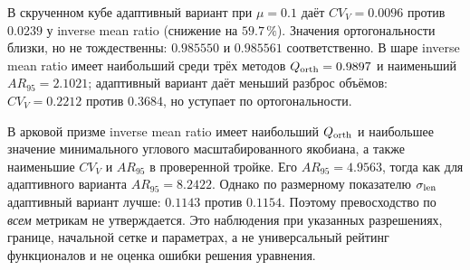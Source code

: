 В скрученном кубе адаптивный вариант при $\mu=0.1$ даёт
$CV_V=0.0096$ против $0.0239$ у inverse mean ratio
(снижение на $59.7\,\%$). Значения ортогональности близки, но не тождественны:
$0.985550$ и $0.985561$ соответственно.
В шаре inverse mean ratio имеет наибольший среди трёх методов
$Q_{\rm orth}=0.9897$ и наименьший
$AR_{95}=2.1021$; адаптивный вариант даёт меньший разброс
объёмов: $CV_V=0.2212$ против $0.3684$,
но уступает по ортогональности.

В арковой призме inverse mean ratio имеет наибольший $Q_{\rm orth}$ и
наибольшее значение минимального углового масштабированного якобиана, а также наименьшие $CV_V$ и $AR_{95}$
в проверенной тройке. Его $AR_{95}=4.9563$, тогда как для
адаптивного варианта $AR_{95}=8.2422$.
Однако по размерному показателю $\sigma_{\rm len}$ адаптивный вариант лучше:
$0.1143$ против $0.1154$.
Поэтому превосходство по \emph{всем} метрикам не утверждается.
Это наблюдения при указанных разрешениях, границе, начальной сетке и параметрах,
а не универсальный рейтинг функционалов и не оценка ошибки решения уравнения.
